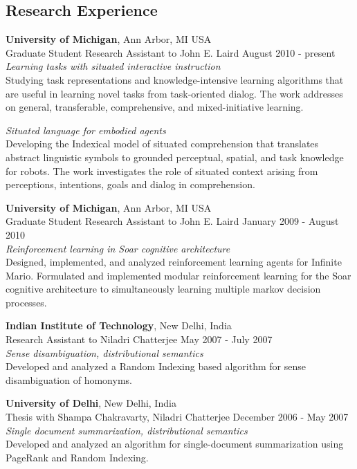 \documentclass[margin,line,11pt]{res}
\begin{document}
\begin{resume}
\section{\sc Research Experience}
{\bf University of Michigan}, Ann Arbor, MI USA \\ {Graduate Student
  Research Assistant} to John E. Laird \hfill August 2010 -
present\\ \emph{Learning tasks with situated interactive instruction}
\\ Studying task representations and knowledge-intensive learning
algorithms that are useful in learning novel tasks from task-oriented
dialog. The work addresses on general, transferable, comprehensive,
and mixed-initiative learning.

\emph{Situated language for embodied agents}\\ Developing the
Indexical model of situated comprehension that translates abstract
linguistic symbols to grounded perceptual, spatial, and task knowledge
for robots. The work investigates the role of situated context arising
from perceptions, intentions, goals and dialog in comprehension.

{\bf University of Michigan}, Ann Arbor, MI USA \\
{Graduate Student Research Assistant} to John E. Laird \hfill January 2009 - August 2010\\
\emph{Reinforcement learning in Soar cognitive architecture}\\
 Designed, implemented, and analyzed reinforcement learning agents for
 Infinite Mario. Formulated and implemented modular reinforcement learning for the Soar cognitive
 architecture to simultaneously learning multiple markov decision processes. 

{\bf Indian Institute of Technology}, New Delhi, India \\
{Research Assistant} to Niladri Chatterjee \hfill May 2007 - July 2007\\
\emph{Sense disambiguation, distributional semantics}\\
Developed and analyzed a Random Indexing based algorithm for sense disambiguation of homonyms.

{\bf University of Delhi}, New Delhi, India \\
{Thesis} with Shampa Chakravarty, Niladri Chatterjee \hfill December 2006 - May 2007\\
\emph{Single document summarization, distributional semantics}\\
Developed and analyzed an algorithm for single-document summarization using PageRank and Random Indexing.



\end{resume}
\end{document}

